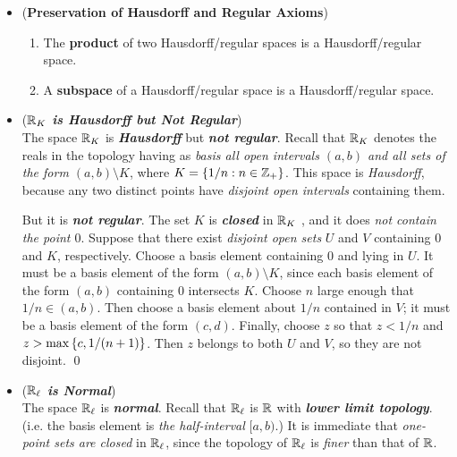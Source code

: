 \documentclass[11pt]{article}
\begin{document}
\begin{itemize}
\item 
\begin{proposition} 
(\textbf{Preservation of Hausdorff and Regular Axioms})
\begin{enumerate}
\item The \textbf{product} of two Hausdorff/regular spaces is a Hausdorff/regular space. 
\item A \textbf{subspace} of a Hausdorff/regular space is a Hausdorff/regular space.
\end{enumerate}
\end{proposition}

\item \begin{example} (\emph{\textbf{${\mathbb R}_{K}$ is Hausdorff but Not Regular}})\\
The space ${\mathbb R}_K$ is \emph{\textbf{Hausdorff}} but \emph{\textbf{not regular}}. Recall that ${\mathbb R}_K$ denotes the reals
in the topology having as \emph{basis all open intervals $(a, b)$ and all sets of the form $(a, b) \setminus K$},
where $K = \left\{1/n: n \in {\mathbb Z}_{+}\right\}$. This space is \emph{Hausdorff}, because any two distinct points have
\emph{disjoint open intervals} containing them.

But it is \emph{\textbf{not regular}}. The set $K$ is \emph{\textbf{closed}} in ${\mathbb R}_K$ , and it does \emph{not contain the point $0$}.
Suppose that there exist \emph{disjoint open sets} $U$ and $V$ containing $0$ and $K$, respectively.
Choose a basis element containing $0$ and lying in $U$. It must be a basis element of the form $(a, b) \setminus K$, since each basis element of the form $(a, b)$ containing $0$ intersects $K$. Choose $n$ large enough that $1/n \in (a, b)$. Then choose a basis element about $1/n$ contained in $V$;
it must be a basis element of the form $(c, d)$. Finally, choose $z$ so that $z < 1/n$ and $z > \max\left\{c, 1/(n + 1)\right\}$. Then $z$ belongs to both $U$ and $V$, so they are not disjoint. \qed
\end{example}

\item \begin{example}(\emph{\textbf{${\mathbb R}_{\ell}$ is Normal}})\\
The space ${\mathbb R}_{\ell}$ is \emph{\textbf{normal}}. Recall that ${\mathbb R}_{\ell}$ is ${\mathbb R}$ with \emph{\textbf{lower limit topology}}. (i.e. the basis element is \emph{the half-interval} $[a, b)$.) It is immediate that \emph{one-point sets are closed} in ${\mathbb R}_{\ell}$, since the topology of ${\mathbb R}_{\ell}$ is \emph{finer} than that of ${\mathbb R}$. 


\end{example}
\end{itemize}
\end{document}
